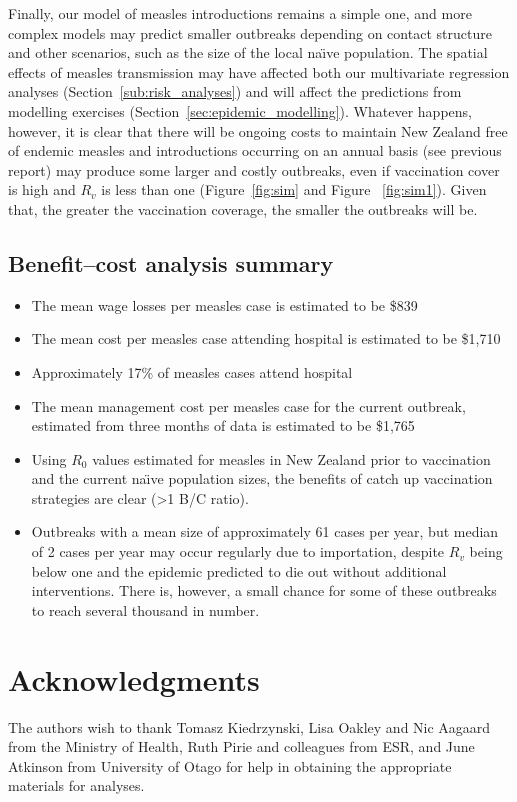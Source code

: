 \documentclass{article}
\begin{document}
\begin{itemize}
Finally, our model of measles introductions remains a simple one, and more complex models may predict smaller outbreaks depending on contact structure and other scenarios, such as the size of the local na\"{\i}ve population. The spatial effects of measles transmission may have affected both our multivariate regression analyses (Section~\ref{sub:risk_analyses}) and will affect the predictions from modelling exercises (Section~\ref{sec:epidemic_modelling}). Whatever happens, however, it is clear that there will be ongoing costs to maintain New Zealand free of endemic measles and introductions occurring on an annual basis (see previous report) may produce some larger and costly outbreaks, even if vaccination cover is high and $R_v$ is less than one (Figure~\ref{fig:sim} and Figure ~\ref{fig:sim1}). Given that, the greater the vaccination coverage, the smaller the outbreaks will be.

\subsection{Benefit--cost analysis summary}
\begin{itemize}
\item The mean wage losses per measles case is estimated to be \$839
\item The mean cost per measles case attending hospital is estimated to be \$1,710
\item Approximately 17\% of measles cases attend hospital
\item The mean management cost per measles case for the current outbreak, estimated from three months of data is estimated to be \$1,765
\item Using $R_0$ values estimated for measles in New Zealand prior to vaccination and the current na\"{\i}ve population sizes, the benefits of catch up vaccination strategies are clear (>1 B/C ratio).
\item Outbreaks with a mean size of approximately 61 cases per year, but median of 2 cases per year may occur regularly due to importation, despite $R_v$ being below one and the epidemic predicted to die out without additional interventions. There is, however, a small chance for some of these outbreaks to reach several thousand in number.
\end{itemize}

\section{Acknowledgments}
The authors wish to thank Tomasz Kiedrzynski, Lisa Oakley and Nic Aagaard from the Ministry of Health, Ruth Pirie and colleagues from ESR, and June Atkinson from University of Otago for help in obtaining the appropriate materials for analyses.


\end{itemize}
\end{document}
